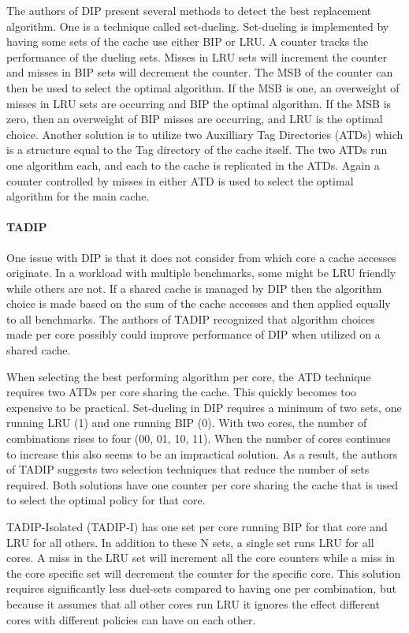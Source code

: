 The authors of DIP present several methods to detect the best replacement algorithm. 
One is a technique called set-dueling.
Set-dueling is implemented by having some sets of the cache use either BIP or LRU. 
A counter tracks the performance of the dueling sets.
Misses in LRU sets will increment the counter and misses in BIP sets will decrement the counter.
The MSB of the counter can then be used to select the optimal algorithm.
If the MSB is one, an overweight of misses in LRU sets are occurring and BIP the optimal algorithm. 
If the MSB is zero, then an overweight of BIP misses are occurring, and LRU is the optimal choice.
Another solution is to utilize two Auxilliary Tag Directories (ATDs) which is a structure equal to the Tag directory of the cache itself.
The two ATDs run one algorithm each, and each to the cache is replicated in the ATDs.
Again a counter controlled by misses in either ATD is used to select the optimal algorithm for the main cache.

\paragraph{TADIP}

One issue with DIP is that it does not consider from which core a cache accesses originate.
In a workload with multiple benchmarks, some might be LRU friendly while others are not. 
If a shared cache is managed by DIP then the algorithm choice is made based on the sum of the cache accesses and then applied equally to all benchmarks.
The authors of TADIP recognized that algorithm choices made per core possibly could improve performance of DIP when utilized on a shared cache.

When selecting the best performing algorithm per core, the ATD technique requires two ATDs per core sharing the cache. 
This quickly becomes too expensive to be practical.
Set-dueling in DIP requires a minimum of two sets, one running LRU (1) and one running BIP (0). 
With two cores, the number of combinations rises to four (00, 01, 10, 11).
When the number of cores continues to increase this also seems to be an impractical solution.
As a result, the authors of TADIP suggests two selection techniques that reduce the number of sets required. 
Both solutions have one counter per core sharing the cache that is used to select the optimal policy for that core.

TADIP-Isolated (TADIP-I) has one set per core running BIP for that core and LRU for all others.
In addition to these N sets, a single set runs LRU for all cores. 
A miss in the LRU set will increment all the core counters while a miss in the core specific set will decrement the counter for the specific core.
This solution requires significantly less duel-sets compared to having one per combination, but because it assumes that all other cores run LRU it ignores the effect different cores with different policies can have on each other.

